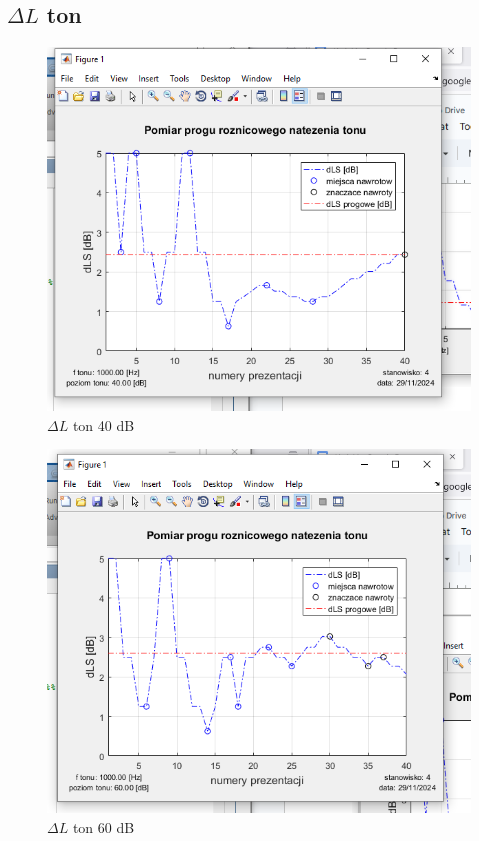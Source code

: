 \documentclass[12pt]{article}
\begin{document}
\subsection{$\Delta L$ ton}
\begin{figure}[H]
    \centering
    \includegraphics[width=\textwidth]{ton_40.png}
    \caption{$\Delta L$ ton 40 dB}
\end{figure}
\begin{figure}[H]
    \centering
    \includegraphics[width=\textwidth]{ton_60.png}
    \caption{$\Delta L$ ton 60 dB}
\end{figure}
\end{document}
